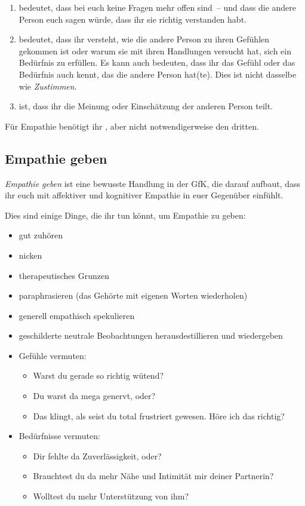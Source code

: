 \begin{enumerate}
  \item {} bedeutet, dass bei euch keine Fragen mehr offen sind~-- und dass die andere Person euch sagen würde, dass ihr sie richtig verstanden habt.
  \item {} bedeutet, dass ihr versteht, wie die andere Person zu ihren Gefühlen gekommen ist oder warum sie mit ihren Handlungen versucht hat, sich ein Bedürfnis zu erfüllen. Es kann auch bedeuten, dass ihr das Gefühl oder das Bedürfnis auch kennt, das die andere Person hat(te). Dies ist nicht dasselbe wie \emph{Zustimmen}.
  \item {} ist, dass ihr die Meinung oder Einschätzung der anderen Person teilt.
\end{enumerate}

Für Empathie benötigt ihr , aber nicht notwendigerweise den dritten.


\subsection{Empathie geben}
\label{empathie-geben}

\emph{Empathie geben} ist eine bewusste Handlung in der GfK, die darauf aufbaut, dass ihr euch mit affektiver und kognitiver Empathie in euer Gegenüber einfühlt.

Dies sind einige Dinge, die ihr tun könnt, um Empathie zu geben:

\begin{itemize}
  \item gut zuhören
  \item nicken
  \item \glqq therapeutisches Grunzen\grqq
  \item paraphrasieren (das Gehörte mit eigenen Worten wiederholen) 
  \item generell \glqq empathisch spekulieren\grqq
  \item geschilderte neutrale Beobachtungen herausdestillieren und wiedergeben
  \item Gefühle vermuten:
    \begin{itemize}
      \item \glqq Warst du gerade so richtig wütend?\grqq
      \item \glqq Du warst da mega genervt, oder?\grqq
      \item \glqq Das klingt, als seist du total frustriert gewesen. Höre ich das richtig?\grqq
    \end{itemize}
  \item Bedürfnisse vermuten:
    \begin{itemize}
      \item \glqq Dir fehlte da Zuverlässigkeit, oder?\grqq
      \item \glqq Brauchtest du da mehr Nähe und Intimität mir deiner Partnerin?\grqq
      \item \glqq Wolltest du mehr Unterstützung von ihm?\grqq
    \end{itemize}
\end{itemize}



